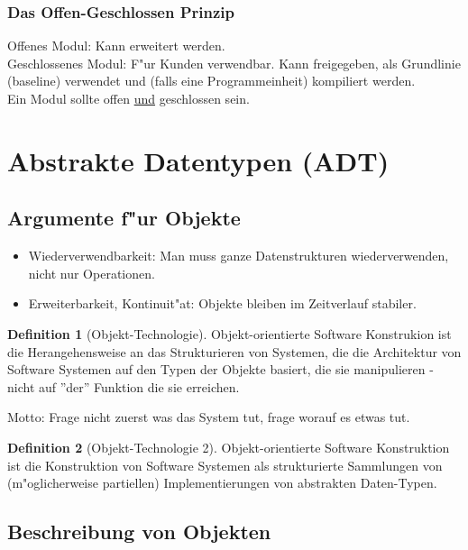 \documentclass[german, 10pt, a4paper, twocolumn]{scrartcl}
\theoremstyle{definition}
\newtheorem*{definition}{Definition}
\begin{document}
\subsubsection{Das Offen-Geschlossen Prinzip}

Offenes Modul: Kann erweitert werden.\\
Geschlossenes Modul: F"ur Kunden verwendbar. Kann freigegeben, als Grundlinie (baseline) verwendet und (falls eine Programmeinheit) kompiliert werden.\\

Ein Modul sollte offen \underline{und} geschlossen sein.

\section{Abstrakte Datentypen (ADT)}

\subsection{Argumente f"ur Objekte}

\begin{itemize}
	\item Wiederverwendbarkeit: Man muss ganze Datenstrukturen wiederverwenden, nicht nur Operationen.
	\item Erweiterbarkeit, Kontinuit"at: Objekte bleiben im Zeitverlauf stabiler.
\end{itemize}

\begin{definition}[Objekt-Technologie]
 Objekt-orientierte Software Konstrukion ist die Herangehensweise an das Strukturieren von Systemen, die die Architektur von Software Systemen auf den Typen der Objekte basiert, die sie manipulieren - nicht auf ''der'' Funktion die sie erreichen.
\end{definition}

Motto: Frage nicht zuerst was das System tut, frage worauf es etwas tut.

\begin{definition}[Objekt-Technologie 2]
	Objekt-orientierte Software Konstruktion ist die Konstruktion von Software Systemen als strukturierte Sammlungen von (m"oglicherweise partiellen) Implementierungen von abstrakten Daten-Typen.
\end{definition}

\subsection{Beschreibung von Objekten}
\end{document}
